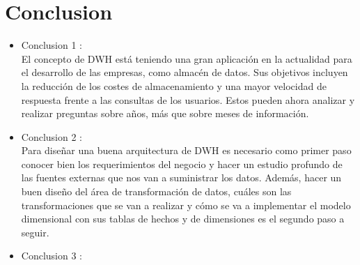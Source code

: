 \documentclass[preprint,12pt]{elsarticle}
\begin{document}
\section{Conclusion}
\begin{itemize}
\item Conclusion 1 : \\

El concepto de DWH está teniendo una gran aplicación en la actualidad para el desarrollo de las empresas, como almacén de datos. Sus objetivos incluyen la reducción de los costes de almacenamiento y una mayor velocidad de respuesta frente a las consultas de los usuarios. Estos pueden ahora analizar y realizar preguntas sobre años, más que sobre meses de información.


\item Conclusion 2 : \\
Para diseñar una buena arquitectura de DWH es necesario como primer paso conocer bien los requerimientos del negocio y hacer un estudio profundo de las fuentes externas que nos van a suministrar los datos. Además, hacer un buen diseño del área de transformación de datos, cuáles son las transformaciones que se van a realizar y cómo se va a implementar el modelo dimensional con sus tablas de hechos y de dimensiones es el segundo paso a seguir.
\item Conclusion 3 : \\



\end{itemize}
	
	

	
	\newpage
	
		 
\citep{DLake01}  
\citep{DLake02}  
\citep{DWarehouse01}  
\citep{DWarehouse02}  
\citep{DWarehouse03}  
\citep{DWarehouse03}  
\citep{DWarehouseVsDLake01}  
\citep{DWarehouseVsDLake02}  
	
	
	
	
	
\end{document}
